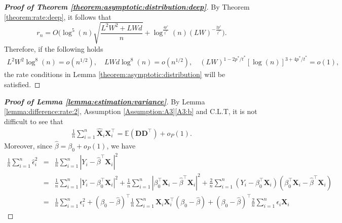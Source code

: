 \documentclass[11pt, preprint]{imsart}
\numberwithin{equation}{section}
\def \bfD{\mathbf{D}}
\def \bfX{\mathbf{X}}
\def \bfD{\mathbf{D}}
\def \ev{\mathbb{E}}
\theoremstyle{plain}
\theoremstyle{definition}
\begin{document}
\begin{proof}[\textbf{Proof of Theorem \ref{theorem:asymptotic:distribution:deep}}]
By Theorem \ref{theorem:rate:deep}, it follows that
\begin{equation*}
r_n=O\bigg(\log^5(n)\sqrt{\frac{L^2W^2+LWd}{n}}+\log^{\frac{4p^*}{t^*}}(n)(LW)^{-\frac{2p^*}{t^*}}\bigg).
\end{equation*}
Therefore, if the following holds
\begin{eqnarray*}
	L^2W^2\log^8(n)=o(n^{1/2}), \quad LWd\log^8(n)=o(n^{1/2}),\quad (LW)^{1-2p^*/t^*}[\log(n)]^{3+4p^*/t^*}=o(1),
\end{eqnarray*}
the rate conditions in Lemma \ref{theorem:asymptotic:distribution} will be satisfied.
\end{proof}



\begin{proof}[\textbf{Proof of Lemma \ref{lemma:estimation:variance}}]
By Lemma \ref{lemma:difference:rate:2}, Assumption \ref{Assumption:A3}\ref{A3:b} and C.L.T, it is not difficult to see that
\begin{eqnarray*}
	\frac{1}{n}\sum_{i=1}^n\widehat{\bfX}_i\bfX_i^\top=\ev(\bfD\bfD^\top)+o_P(1).
\end{eqnarray*}
Moreover, since $\widehat{\beta}=\beta_0+o_P(1)$, we have
\begin{eqnarray*}
	\frac{1}{n}\sum_{i=1}^n\widehat{\epsilon}_i^2&=&\frac{1}{n}\sum_{i=1}^n|Y_i-\widehat{\beta}^\top\bfX_i|^2\nonumber\\
	&=&\frac{1}{n}\sum_{i=1}^n|Y_i-\beta_0^\top\bfX_i|^2+\frac{1}{n}\sum_{i=1}^n|\beta_0^\top\bfX_i-\widehat{\beta}^\top\bfX_i|^2+\frac{2}{n}\sum_{i=1}^n(Y_i-\beta_0^\top\bfX_i)(\beta_0^\top\bfX_i-\widehat{\beta}^\top\bfX_i)\nonumber\\
	&=&\frac{1}{n}\sum_{i=1}^n\epsilon_i^2+(\beta_0-\widehat{\beta})^\top\frac{1}{n}\sum_{i=1}^n\bfX_i\bfX_i^\top(\beta_0-\widehat{\beta})+(\beta_0-\widehat{\beta})^\top\frac{2}{n}\sum_{i=1}^n \epsilon_i\bfX_i
\end{eqnarray*}
\end{proof}
\end{document}
